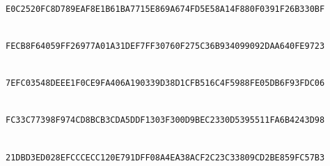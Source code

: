 \noindent{}\\
{\footnotesize\texttt{E0C2520FC8D789EAF8E1B61BA7715E86\allowbreak{}9A674FD5E58A14F880F0391F26B330BF}}\par\smallskip

\noindent{}\\
{\footnotesize\texttt{FECB8F64059FF26977A01A31DEF7FF30\allowbreak{}760F275C36B934099092DAA640FE9723}}\par\smallskip

\noindent{}\\
{\footnotesize\texttt{7EFC03548DEEE1F0CE9FA406A190339D\allowbreak{}38D1CFB516C4F5988FE05DB6F93FDC06}}\par\smallskip

\noindent{}\\
{\footnotesize\texttt{FC33C77398F974CD8BCB3CDA5DDF1303\allowbreak{}F300D9BEC2330D5395511FA6B4243D98}}\par\smallskip

\noindent{}\\
{\footnotesize\texttt{21DBD3ED028EFCCCECC120E791DFF08A\allowbreak{}4EA38ACF2C23C33809CD2BE859FC57B3}}\par\smallskip
